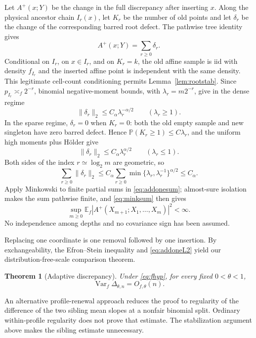 \documentclass[11pt]{article}
\numberwithin{equation}{section}
\newtheorem{theorem}{Theorem}[section]
\theoremstyle{definition}\newtheorem{definition}[theorem]{Definition}
\theoremstyle{remark}\newtheorem{remark}[theorem]{Remark}
\newcommand{\E}{\mathbb E}\newcommand{\Pp}{\mathbb P}
\newcommand{\Var}{\operatorname {Var}}\newcommand{\Cov}{\operatorname {Cov}}
\newcommand{\1}{\mathbf 1}\newcommand{\cD}{\mathcal D}
\begin{document}
Let $A^+(x;Y)$ be the change in the full discrepancy after inserting $x$.
Along the physical ancestor chain $I_r(x)$, let $K_r$ be the number of old
points and let $\delta_r$ be the change of the corresponding barred root
defect.  The pathwise tree identity gives
\begin{equation}A^+(x;Y)=\sum_{r\ge0}\delta_r.             \label{eq:addonesum}
\end{equation}
Conditional on $I_r$, on $x\in I_r$, and on $K_r=k$, the old affine sample
is iid with density $f_{I_r}$ and the inserted affine point is independent
with the same density.  This legitimate cell-count conditioning permits
Lemma~\ref{lem:rootstab}.  Since $p_{I_r}\asymp_f2^{-r}$, binomial
negative-moment bounds, with $\lambda_r=m2^{-r}$, give in the dense regime
\begin{equation}\|\delta_r\|_2\le C_\alpha\lambda_r^{-\alpha/2}
 \qquad(\lambda_r\ge1).                                    \label{eq:dense}
\end{equation}
In the sparse regime, $\delta_r=0$ when $K_r=0$: both the old empty sample
and new singleton have zero barred defect.  Hence
$\Pp(K_r\ge1)\le C\lambda_r$, and the uniform high moments plus H\"older
give
\begin{equation}\|\delta_r\|_2\le C_\alpha\lambda_r^{\alpha/2}
 \qquad(\lambda_r\le1).                                    \label{eq:sparse}
\end{equation}
Both sides of the index $r\simeq\log_2m$ are geometric, so
\begin{equation}
 \sum_{r\ge0}\|\delta_r\|_2\le
 C_\alpha\sum_{r\ge0}\min\{\lambda_r,\lambda_r^{-1}\}^{\alpha/2}
 \le C_\alpha.                                             \label{eq:minksum}
\end{equation}
Apply Minkowski to finite partial sums in \eqref{eq:addonesum}; almost-sure
isolation makes the sum pathwise finite, and \eqref{eq:minksum} then gives
\begin{equation}
 \sup_{m\ge0}\E_f|A^+(X_{m+1};X_1,\ldots,X_m)|^2<\infty. \label{eq:addoneL2}
\end{equation}
No independence among depths and no covariance sign has been assumed.

Replacing one coordinate is one removal followed by one insertion.  By
exchangeability, the Efron--Stein inequality and \eqref{eq:addoneL2} yield
our distribution-free-scale comparison theorem.
\begin{theorem}[Adaptive discrepancy]\label{thm:nonunifdelta}
Under \eqref{eq:fhyp}, for every fixed $0<\theta<1$,
\begin{equation}\Var_f\Delta_{\theta,n}=O_{f,\theta}(n).   \label{eq:nonunifdelta}
\end{equation}
\end{theorem}
An alternative profile-renewal approach reduces the proof to regularity of
the difference of the two sibling mean slopes at a nonfair binomial split.
Ordinary within-profile regularity does not prove that estimate.  The
stabilization argument above makes the sibling estimate unnecessary.
\end{document}
